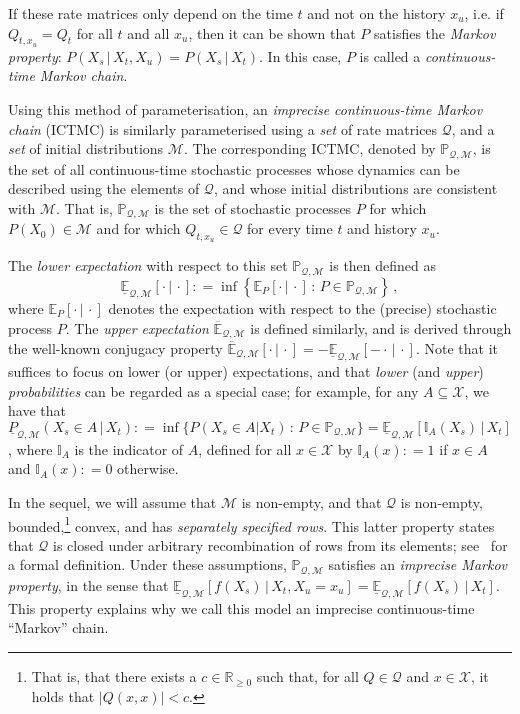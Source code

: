 \documentclass[twoside,11pt]{article}
\newcommand{\reals}{\mathbb{R}}
\newcommand{\realsnonneg}{\reals_{\geq 0}}
\newcommand{\states}{\mathcal{X}}
\newcommand{\lexp}{\underline{\mathbb{E}}_{\rateset,\mathcal{M}}}
\newcommand{\uexp}{\overline{\mathbb{E}}_{\rateset,\mathcal{M}}}
\newcommand{\ind}[1]{\mathbb{I}_{#1}}
\newcommand{\rateset}{\mathcal{Q}}
\newcommand{\abs}[1]{\left\vert #1 \right\vert}
\newcommand{\coloneqq}{:\!=}
\begin{document}
If these rate matrices only depend on the time $t$ and not on the history $x_u$, i.e. if $Q_{t,x_u}=Q_t$ for all $t$ and all $x_u$, then it can be shown that $P$ satisfies the \emph{Markov property}: $P(X_s\,\vert\,X_t,X_u)=P(X_s\,\vert\,X_t)$. In this case, $P$ is called a \emph{continuous-time Markov chain}.

Using this method of parameterisation, an \emph{imprecise continuous-time Markov chain} (ICTMC) is similarly parameterised using a \emph{set} of rate matrices $\rateset$, and a \emph{set} of initial distributions $\mathcal{M}$. The corresponding ICTMC, denoted by $\mathbb{P}_{\rateset,\mathcal{M}}$, is the set of all continuous-time stochastic processes whose dynamics can be described using the elements of $\rateset$, and whose initial distributions are consistent with $\mathcal{M}$. That is, $\mathbb{P}_{\rateset,\mathcal{M}}$ is the set of stochastic processes $P$ for which $P(X_0)\in\mathcal{M}$ and for which $Q_{t,x_u}\in\rateset$ for every time $t$ and history $x_u$.

The \emph{lower expectation} with respect to this set $\mathbb{P}_{\rateset,\mathcal{M}}$ is then defined as
\begin{equation*}
\underline{\mathbb{E}}_{\rateset,\mathcal{M}}[\cdot\,\vert\,\cdot] \coloneqq \inf\left\{ \mathbb{E}_P[\cdot\,\vert\,\cdot]\,:\, P\in\mathbb{P}_{\rateset,\mathcal{M}} \right\}\,,
\end{equation*}
where $\mathbb{E}_P[\cdot\,\vert\,\cdot]$ denotes the expectation with respect to the (precise) stochastic process $P$. The \emph{upper expectation} $\uexp$ is defined similarly, and is derived through the well-known conjugacy property $\uexp[\cdot\,\vert\,\cdot] = -\lexp[-\cdot\,\vert\,\cdot]$. Note that it suffices to focus on lower (or upper) expectations, and that \emph{lower} (and \emph{upper}) \emph{probabilities} can be regarded as a special case; for example, for any $A\subseteq\states$, we have that $\underline{P}_{\rateset,\mathcal{M}}(X_s\in A\,\vert\,X_t) \coloneqq \inf\{P(X_s\in A\vert X_t)\,:\,P\in\mathbb{P}_{\rateset,\mathcal{M}}\}=\lexp[\ind{A}(X_s)\,\vert\,X_t]$, where $\ind{A}$ is the indicator of $A$, defined for all $x\in\states$ by $\ind{A}(x)\coloneqq1$ if $x\in A$ and $\ind{A}(x)\coloneqq0$ otherwise.

In the sequel, we will assume that $\mathcal{M}$ is non-empty, and that $\rateset$ is non-empty, bounded,\footnote{That is, that there exists a $c\in\realsnonneg$ such that, for all $Q\in\rateset$ and $x\in\states$, it holds that $\abs{Q(x,x)}<c$.} convex, and has \emph{separately specified rows}. This latter property states that $\rateset$ is closed under arbitrary recombination of rows from its elements; see~\citep[Definition 24]{krak2016ictmc} for a formal definition. 
Under these assumptions, $\mathbb{P}_{\rateset,\mathcal{M}}$ satisfies an \emph{imprecise Markov property}, in the sense that $\lexp[f(X_s)\,\vert\,X_t,X_u=x_u]=\lexp[f(X_s)\,\vert\,X_t]$. This property explains why we call this model an imprecise continuous-time ``Markov'' chain.
\end{document}

